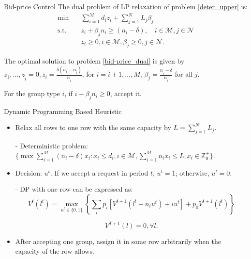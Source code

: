      \begin{frame}{Bid-price Control}
        The dual problem of LP relaxation of problem \eqref{deter_upper} is:
        \begin{equation}\label{bid-price_dual}
          \begin{aligned}
          \min \quad & \sum_{i=1}^{M} d_i z_i + \sum_{j= 1}^{N} L_j \beta_{j} \\
          \text {s.t.} \quad & z_{i} + \beta_j n_i \geq (n_i-\delta), \quad i \in \mathcal{M}, j \in \mathcal{N} \\
          & z_{i} \geq 0, i \in \mathcal{M}, \beta_{j} \geq 0, j \in \mathcal{N}.
          \end{aligned}
        \end{equation}
        
        \small
        
        The optimal solution to problem \eqref{bid-price_dual} is given by $z_1, \ldots, z_{\tilde{i}} =0, z_i = \frac{\delta (n_i - n_{\tilde{i}})}{n_{\tilde{i}}}$, for $i = \tilde{i} + 1, \ldots, M$, $\beta_j = \frac{n_{\tilde{i}} - \delta}{n_{\tilde{i}}}$ for all $j$.
        \vspace{0.5cm}

        For the group type $i$, if $i - \beta_j n_i \geq 0$, accept it. 
      \end{frame}

      \begin{frame}{Dynamic Programming Based Heuristic}
        \begin{itemize}
        \item Relax all rows to one row with the same capacity by $L = \sum_{j=1}^{N} L_j$.
        \item[-] Deterministic problem: $\{\max \sum_{i=1}^{M} (n_i- \delta) x_{i}: x_{i} \leq d_{i}, i \in \mathcal{M}, \sum_{i=1}^{M} n_{i} x_{i} \leq L, x_{i} \in \mathbb{Z}^{+}_{0}\}$.
        \item Decision: $u^{t}$. If we accept a request in period $t$, $u^t = 1$; otherwise, $u^t =0$.  
        \item[-] DP with one row can be expressed as:
        $$V^{t}(l^{t}) =  \max_{u^{t} \in \{0,1\}} \left\{ \sum_{i} p_i [V^{t+1}(l^{t}-n_i u^{t})+ i u^{t}] + p_0 V^{t+1}(l^{t})\right\}$$

        $$V^{T+1}(l) =0, \forall l.$$
        \item After accepting one group, assign it in some row arbitrarily when the capacity of the row allows.
        \end{itemize}
      \end{frame}
      
